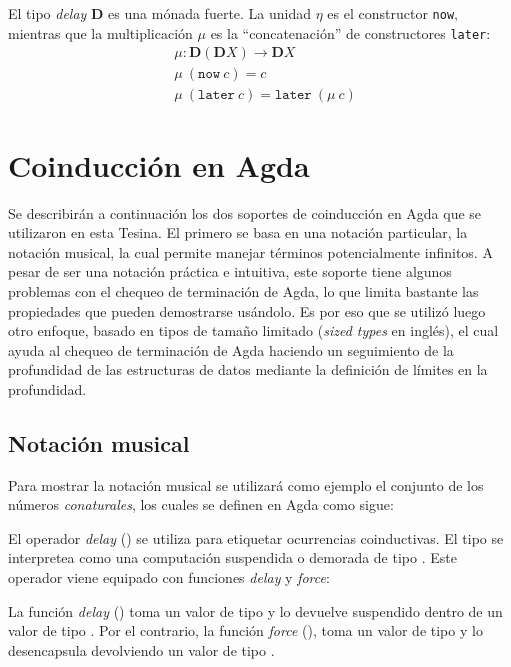 El tipo \textit{delay} $\mathbf{D}$ es una mónada fuerte. La unidad $\eta$ es el constructor \texttt{now}, mientras que la multiplicación $\mu$ es la ``concatenación'' de constructores \texttt{later}:
\begin{align*}
& \mu : \mathbf{D} (\mathbf{D} X) \rightarrow \mathbf{D} X  \\
& \mu \ (\mathtt{now} \ c) = c \\
& \mu \ (\mathtt{later} \ c) = \mathtt{later} \ (\mu \ c)
\end{align*}


\section{Coinducción en Agda}\label{coind:agda}

Se describirán a continuación los dos soportes de coinducción en Agda que se utilizaron en esta Tesina. El primero se basa en una notación particular, la notación musical, la cual permite manejar términos potencialmente infinitos. A pesar de ser una notación práctica e intuitiva, este soporte tiene algunos problemas con el chequeo de terminación de Agda, lo que limita bastante las propiedades que pueden demostrarse usándolo. Es por eso que se utilizó luego otro enfoque, basado en tipos de tamaño limitado (\textit{sized types} en inglés), el cual ayuda al chequeo de terminación de Agda haciendo un seguimiento de la profundidad de las estructuras de datos mediante la definición de límites en la profundidad. 

\subsection{Notación musical}\label{coind:agda:musical}

Para mostrar la notación musical se utilizará como ejemplo el conjunto de los números \textit{conaturales}, los cuales se definen en Agda como sigue:


El operador \textit{delay} (\AgdaDatatype{$\infty$}) se utiliza para etiquetar ocurrencias coinductivas. El tipo  se interpretea como una computación suspendida o demorada de tipo . Este operador viene equipado con funciones \textit{delay} y \textit{force}:


La función \textit{delay} (\AgdaFunction{$\sharp\_$}) toma un valor de tipo  y lo devuelve suspendido dentro de un valor de tipo . Por el contrario, la función \textit{force} (\AgdaFunction{$\flat$}), toma un valor de tipo  y lo desencapsula devolviendo un valor de tipo .


